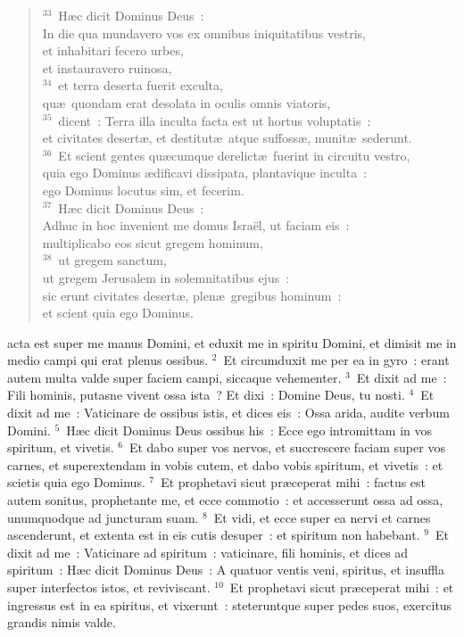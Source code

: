 \begin{verse}${}^{33}$~H\ae c dicit Dominus Deus~:\\ In die qua mundavero vos ex omnibus iniquitatibus vestris,\\ et inhabitari fecero urbes,\\ et instauravero ruinosa,\\
${}^{34}$~et terra deserta fuerit exculta,\\ qu\ae\ quondam erat desolata in oculis omnis viatoris,\\
${}^{35}$~dicent~: Terra illa inculta facta est ut hortus voluptatis~:\\ et civitates desert\ae , et destitut\ae\ atque suffoss\ae , munit\ae\ sederunt.\\
${}^{36}$~Et scient gentes qu\ae cumque derelict\ae\ fuerint in circuitu vestro,\\ quia ego Dominus \ae dificavi dissipata, plantavique inculta~:\\ ego Dominus locutus sim, et fecerim.\\
${}^{37}$~H\ae c dicit Dominus Deus~:\\ Adhuc in hoc invenient me domus Isra\"el, ut faciam eis~:\\ multiplicabo eos sicut gregem hominum,\\
${}^{38}$~ut gregem sanctum,\\ ut gregem Jerusalem in solemnitatibus ejus~:\\ sic erunt civitates desert\ae , plen\ae\ gregibus hominum~:\\ et scient quia ego Dominus.\end{verse}



\bchapter
{}acta est super me manus Domini, et eduxit me in spiritu Domini, et dimisit me in medio campi qui erat plenus ossibus.
${}^{2}$~Et circumduxit me per ea in gyro~: erant autem multa valde super faciem campi, siccaque vehementer.
${}^{3}$~Et dixit ad me~: Fili hominis, putasne vivent ossa ista~? Et dixi~: Domine Deus, tu nosti.
${}^{4}$~Et dixit ad me~: Vaticinare de ossibus istis, et dices eis~: Ossa arida, audite verbum Domini.
${}^{5}$~H\ae c dicit Dominus Deus ossibus his~: Ecce ego intromittam in vos spiritum, et vivetis.
${}^{6}$~Et dabo super vos nervos, et succrescere faciam super vos carnes, et superextendam in vobis cutem, et dabo vobis spiritum, et vivetis~: et scietis quia ego Dominus.
${}^{7}$~Et prophetavi sicut pr\ae ceperat mihi~: factus est autem sonitus, prophetante me, et ecce commotio~: et accesserunt ossa ad ossa, unumquodque ad juncturam suam.
${}^{8}$~Et vidi, et ecce super ea nervi et carnes ascenderunt, et extenta est in eis cutis desuper~: et spiritum non habebant.
${}^{9}$~Et dixit ad me~: Vaticinare ad spiritum~: vaticinare, fili hominis, et dices ad spiritum~: H\ae c dicit Dominus Deus~: A quatuor ventis veni, spiritus, et insuffla super interfectos istos, et reviviscant.
${}^{10}$~Et prophetavi sicut pr\ae ceperat mihi~: et ingressus est in ea spiritus, et vixerunt~: steteruntque super pedes suos, exercitus grandis nimis valde.


